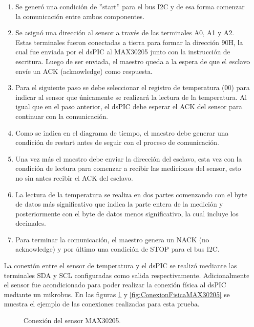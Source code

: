 \begin{enumerate}
	\item Se generó una condición de ''start'' para el bus I2C y de esa forma comenzar la comunicación entre ambos componentes.
	\item Se asignó una dirección al sensor a través de las terminales A0, A1 y A2. Estas terminales fueron conectadas a tierra para formar la dirección 90H, la cual fue enviada por el dsPIC al MAX30205 junto con la instrucción de escritura. Luego de ser enviada, el maestro queda a la espera de que el esclavo envíe un ACK (acknowledge) como respuesta.
	\item Para el siguiente paso se debe seleccionar el registro de temperatura (00) para indicar al sensor que únicamente se realizará la lectura de la temperatura. Al igual que en el paso anterior, el dsPIC debe esperar el ACK del sensor para continuar con la comunicación.
	\item Como se indica en el diagrama de tiempo, el maestro debe generar una condición de restart antes de seguir con el proceso de comunicación. 
	\item Una vez más el maestro debe enviar la dirección del esclavo, esta vez con la condición de lectura para comenzar a recibir las mediciones del sensor, esto no sin antes recibir el ACK del esclavo.
	\item La lectura de la temperatura se realiza en dos partes comenzando con el byte de datos más significativo que indica la parte entera de la medición y posteriormente con el byte de datos menos significativo, la cual incluye los decimales.
	\item Para terminar la comunicación, el maestro genera un NACK (no acknowledge) y por último una condición de STOP para el bus I2C.
\end{enumerate}

La conexión entre el sensor de temperatura y el dsPIC se realizó mediante las terminales SDA y SCL configuradas como salida respectivamente. Adicionalmente el sensor fue acondicionado para poder realizar la conexión física al dsPIC mediante un mikrobus. En las figuras \ref{fig:ConexionLogicaMAX30205} y \ref{fig:ConexionFisicaMAX30205} se muestra el ejemplo de las conexiones realizadas para esta prueba.


\begin{figure}[htbp!]
	\centering
	\caption{Conexión del sensor MAX30205.}
	\label{fig:ConexionLogicaMAX30205}
\end{figure}

